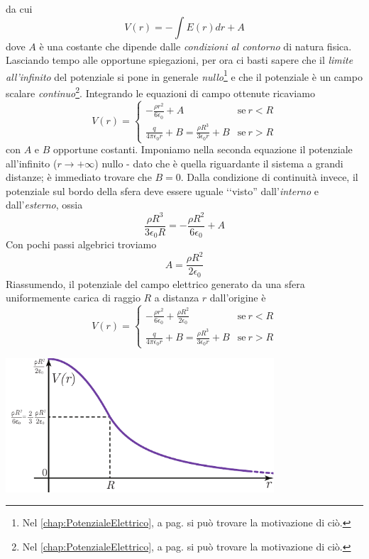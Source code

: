 da cui
\begin{equation*}
	V(r)=-\int E(r)dr+A
\end{equation*}
dove $A$ è una costante che dipende dalle \textit{condizioni al contorno} di natura fisica. Lasciando tempo alle opportune spiegazioni, per ora ci basti sapere che il \textit{limite all'infinito} del potenziale si pone in generale \textit{nullo}\footnote{Nel \autoref{chap:PotenzialeElettrico}, a pag. \pageref{CondizionialContornoPot} si può trovare la motivazione di ciò.} e che il potenziale è un campo scalare \textit{continuo}\footnote{Nel \autoref{chap:PotenzialeElettrico}, a pag. \pageref{PotenzialeContinuo} si può trovare la motivazione di ciò.}. Integrando le equazioni di campo ottenute ricaviamo
\begin{equation*}
	V(r)=\begin{cases}
		\displaystyle-\frac{\rho r^2}{6\epsilon_0} + A&\text{se}\ r< R\\
		\displaystyle\frac{q}{4\pi\epsilon_0 r} + B=\frac{\rho R^3}{3\epsilon_0r} + B&\text{se}\ r> R
	\end{cases}
\end{equation*}
con $A$ e $B$ opportune costanti. Imponiamo nella seconda equazione il potenziale all'infinito ($r\to+\infty$) nullo - dato che è quella riguardante il sistema a grandi distanze; è immediato trovare che $B=0$. Dalla condizione di continuità invece, il potenziale sul bordo della sfera deve essere uguale ‘‘visto'' dall'\textit{interno} e dall'\textit{esterno}, ossia
\begin{equation*}
	\frac{\rho R^3}{3\epsilon_0R}=-\frac{\rho R^2}{6\epsilon_0} + A
\end{equation*}
Con pochi passi algebrici troviamo
\begin{equation*}
	A=\frac{\rho R^2}{2\epsilon_0}
\end{equation*}
Riassumendo, il potenziale del campo elettrico generato da una sfera uniformemente carica di raggio $R$ a distanza $r$ dall'origine è
\begin{equation}
	V(r)=\begin{cases}
		\displaystyle-\frac{\rho r^2}{6\epsilon_0} + \frac{\rho R^2}{2\epsilon_0}&\text{se}\ r< R\\
		\displaystyle\frac{q}{4\pi\epsilon_0 r} + B=\frac{\rho R^3}{3\epsilon_0r} + B&\text{se}\ r> R
	\end{cases}
\end{equation}
\begin{center}
	\includegraphics[width=0.75\textwidth]{images/chp2sferagraf2.pdf}
\end{center}

